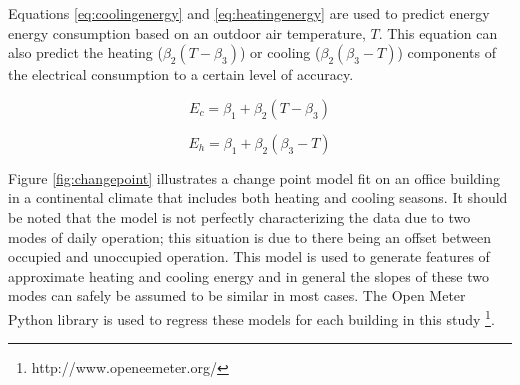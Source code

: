 Equations \ref{eq:coolingenergy} and \ref{eq:heatingenergy} are used to predict energy energy consumption based on an outdoor air temperature, $T$. This equation can also predict the heating ($\beta_2(T - \beta_3)$) or cooling ($\beta_2(\beta_3 - T)$) components of the electrical consumption to a certain level of accuracy. 

\begin{equation}
\label{eq:coolingenergy}
E_c = \beta_1 + \beta_2(T - \beta_3)
\end{equation}

\begin{equation}
\label{eq:heatingenergy}
E_h = \beta_1 + \beta_2(\beta_3 - T)
\end{equation}

Figure \ref{fig:changepoint} illustrates a change point model fit on an office building in a continental climate that includes both heating and cooling seasons. It should be noted that the model is not perfectly characterizing the data due to two modes of daily operation; this situation is due to there being an offset between occupied and unoccupied operation. This model is used to generate features of approximate heating and cooling energy and in general the slopes of these two modes can safely be assumed to be similar in most cases. The Open Meter Python library is used to regress these models for each building in this study \footnote{http://www.openeemeter.org/}.